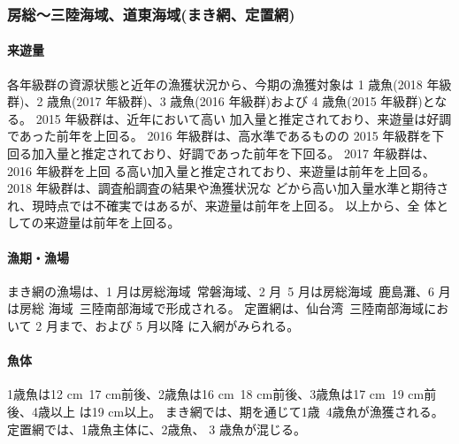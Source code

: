 \documentclass[11pt]{article}
\begin{document}
\subsubsection{房総〜三陸海域、道東海域(まき網、定置網)}
\paragraph{来遊量}
各年級群の資源状態と近年の漁獲状況から、今期の漁獲対象は 1 歳魚(2018 年級群)、2 歳魚(2017
年級群)、3 歳魚(2016 年級群)および 4 歳魚(2015 年級群)となる。
2015 年級群は、近年において高い 加入量と推定されており、来遊量は好調であった前年を上回る。
2016 年級群は、高水準であるものの 2015 年級群を下回る加入量と推定されており、好調であった前年を下回る。
2017 年級群は、2016 年級群を上回 る高い加入量と推定されており、来遊量は前年を上回る。
2018 年級群は、調査船調査の結果や漁獲状況な どから高い加入量水準と期待され、現時点では不確実ではあるが、来遊量は前年を上回る。
以上から、全 体としての来遊量は前年を上回る。
\paragraph{漁期・漁場}
まき網の漁場は、1 月は房総海域~常磐海域、2 月~5 月は房総海域~鹿島灘、6 月は房総 海域~三陸南部海域で形成される。
定置網は、仙台湾~三陸南部海域において 2 月まで、および 5 月以降 に入網がみられる。
\paragraph{魚体}
1歳魚は12 cm~17 cm前後、2歳魚は16 cm~18 cm前後、3歳魚は17 cm~19 cm前後、4歳以上 は19 cm以上。
まき網では、期を通じて1歳~4歳魚が漁獲される。
定置網では、1歳魚主体に、2歳魚、 3 歳魚が混じる。
\end{document}
